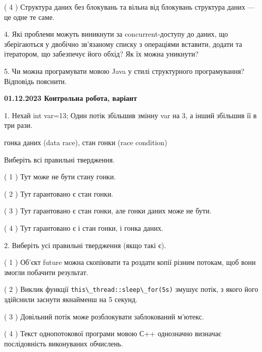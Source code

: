 \documentclass[12pt, ukrainian]{article}
\def\code#1{\Verb!#1!}
\begin{document}
\begin {large}
{( 4 ) Структура даних без блокувань та вільна від блокувань структура даних --- це одне те саме.%


\vspace{5mm}
4. Які проблеми можуть виникнути за concurrent-доступу до даних, що зберігаються у двобічно зв’язаному списку з операціями вставити, додати та ітератором, що забезпечує його обхід? Як їх можна уникнути?



\vspace{5mm}
5. Чи можна програмувати мовою Java у стилі структурного програмування? Відповідь пояснити.
}
\end {large}

\vspace{4mm}
\newpage
\begin {large}

\textbf{01.12.2023 Контрольна робота, варіант  }\par


{
1. Нехай int var=13; Один потік збільшив змінну var на 3, а інший збільшив її в три рази.

гонка даних (data race), стан гонки (race condition)

Виберіть всі правильні твердження.\par
\vspace{2mm}
( 1 ) Тут може не бути стану гонки.%

( 2 ) Тут гарантовано є стан гонки.%

( 3 ) Тут гарантовано є стан гонки, але гонки даних може не бути.%

( 4 ) Тут гарантовано є і стан гонки, і гонка даних.%


\vspace{5mm}
2. Виберіть усі правильні твердження (якщо такі є).\par
\vspace{2mm}

( 1 ) Об’єкт future можна скопіювати та роздати копії різним потокам, щоб вони змогли побачити результат.%

( 2 ) Виклик функції \code{this\_thread::sleep\_for(5s)} змушує потік, з якого його здійснили заснути якнайменш на 5 секунд.%

( 3 ) Довільний потік може розблокувати заблокований м’ютекс.%

( 4 ) Текст однопотокової програми мовою С++ однозначно визначає послідовність виконуваних обчислень.%


}
\end{large}
\end{document}
